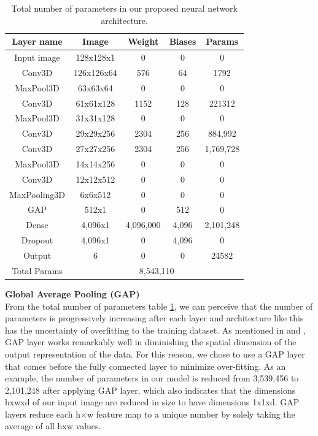 \documentclass{vldb}
\begin{document}
\begin{table}[]
\caption{Total number of parameters in our proposed neural network architecture.}
\centering
\begin{tabular}{|c|c|c|c|c|}
\hline
\textbf{Layer  name} & \textbf{Image} & \textbf{Weight} & \textbf{Biases} & \textbf{Params} \\ \hline
Input image & 128x128x1 & 0 & 0 & 0 \\ \hline
Conv3D & 126x126x64 & 576 & 64 & 1792 \\ \hline
MaxPool3D & 63x63x64 & 0 & 0 & 0 \\ \hline
Conv3D & 61x61x128 & 1152 & 128 & 221312 \\ \hline
MaxPool3D & 31x31x128 & 0 & 0 & 0 \\ \hline
Conv3D & 29x29x256 & 2304 & 256 & 884,992 \\ \hline
Conv3D & 27x27x256 & 2304 & 256 & 1,769,728 \\ \hline
MaxPool3D & 14x14x256 & 0 & 0 & 0 \\ \hline
Conv3D & 12x12x512 & 0 & 0 & 0 \\ \hline
MaxPooling3D & 6x6x512 & 0 & 0 & 0 \\ \hline
GAP & 512x1 & 0 & 512 & 0 \\ \hline
Dense & 4,096x1 & 4,096,000 & 4,096 & 2,101,248 \\ \hline
Dropout & 4,096x1 & 0 & 4,096 & 0 \\ \hline
Output & 6 & 0 & 0 & 24582 \\ \hline
Total Params & \multicolumn{4}{c|}{8,543,110} \\ \hline
\end{tabular}
\label{tab:CNN}
\end{table}\hfill

\textbf{Global Average Pooling (GAP)}\\

From the total number of parameters table \ref{tab:CNN}, we can perceive that the number of parameters is progressively increasing after each layer and architecture like this has the uncertainty of overfitting to the training dataset. As mentioned in \cite{lin2013network} and \cite{zhou2016learning}, GAP layer works remarkably well in diminishing the spatial dimension of the output representation of the data. For this reason, we chose to use a GAP layer that comes before the fully connected layer to minimize over-fitting. As an example, the number of parameters in our model is reduced from 3,539,456 to 2,101,248 after applying GAP layer, which also indicates that the dimensions hxwxd of our input image are reduced in size to have dimensions 1x1xd. GAP layers reduce each h×w feature map to a unique number by solely taking the average of all hxw values.\\
\end{document}
